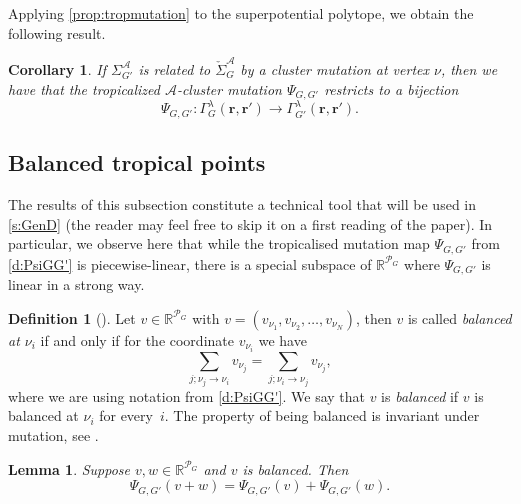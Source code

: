 \documentclass{amsart}
\newtheorem{corollary}[thm]{Corollary}
\newtheorem{lemma}[thm]{Lemma}
\theoremstyle{definition}
\newtheorem{defn}[thm]{Definition}
\numberwithin{equation}{section}
\newcommand{\rr}{\mathbf r}
\newcommand{\R}{\mathbb R}
\newcommand{\Q}{\Gamma}
\begin{document}
Applying \cref{prop:tropmutation} to the superpotential polytope, we obtain the following result.
\begin{corollary} \label{c:GammaMutation}
If  $\Sigma^{\mathcal A}_{G'}$ is related to $\check\Sigma^{\mathcal A}_G$ by a cluster mutation 
	at vertex $\nu$, then we have that the {tropicalized $\mathcal{A}$-cluster mutation} $\Psi_{G,G'}$ restricts to a bijection
\[
\Psi_{G,G'}: 
	\Q_G^\lambda(\rr,\rr') \to 
	\Q_{G'}^\lambda(\rr,\rr'). 
\]
\end{corollary}




\subsection{Balanced tropical points}\label{s:balanced} 
The results of this subsection constitute a technical tool that 
will be used in \cref{s:GenD} (the reader may feel free to skip it on a first reading
of the paper).
In particular, we observe here 
that while the tropicalised mutation map $\Psi_{G,G'}$ from \cref{d:PsiGG'} is  piecewise-linear, there is a special subspace of $\R^{\mathcal P_G}$ where $\Psi_{G,G'}$ is linear in a strong way. 

\begin{defn}[{\cite[Definition~15.8]{RW}}]
Let $v\in \R^{\mathcal P_G}$ with $v=(v_{\nu_1},v_{\nu_2}, \dots,v_{\nu_N})$, then $v$ is called {\it balanced at $\nu_i$} if and only if for the coordinate $v_{\nu_i}$ we have
\[
\sum_{j;\nu_j \to \nu_i} v_{\nu_j}=\sum_{j;\nu_i \to \nu_j} v_{\nu_j},
\]
where we are using notation from \cref{d:PsiGG'}. We say that $v$ is \textit{balanced} 
if $v$ is balanced at $\nu_i$ for every~$i$. 
The property of being balanced is invariant under mutation, see \cite[Proposition~4.8]{Akhtar:PolygonalQuivers}.
\end{defn}  

\begin{lemma}\label{l:balanced}
Suppose $v,w\in\R^{\mathcal P_G}$ and $v$ is balanced. Then
\[
\Psi_{G,G'}(v+w)=\Psi_{G,G'}(v)+\Psi_{G,G'}(w).
\]
\end{lemma}
\end{document}
